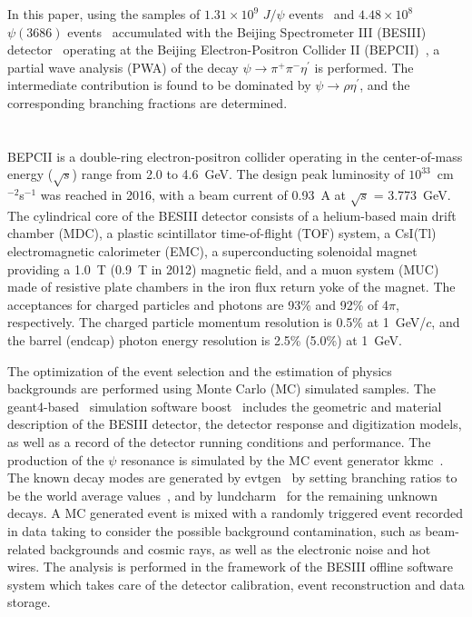 \documentclass[twocolumn,showpacs,aps,prd]{revtex4-1}
\newcommand{\psip}{\psi(3686)}
\begin{document}
In this paper, using the samples of $1.31\times 10^9$ $J/\psi$ events~\cite{jpsinumber} and $4.48\times 10^8$ $\psip$ events~\cite{psipnumber09,psipnumber12} accumulated with the Beijing Spectrometer
III (BESIII) detector~\cite{bes} operating at the Beijing Electron-Positron Collider II (BEPCII)~\cite{bepc}, a partial
wave analysis (PWA) of the decay $\psi \to \pi^+\pi^-\eta^\prime$ is performed. The intermediate contribution is found to be dominated by $\psi \to \rho\eta^\prime$, and the corresponding branching fractions are determined.



\section{}

BEPCII is a double-ring electron-positron collider operating in the center-of-mass energy ($\sqrt s$) range from 2.0 to 4.6~GeV.
The design peak luminosity of $10^{33}$~cm$^{-2}$s$^{-1}$ was reached in 2016, with a beam current of 0.93~A at $\sqrt s$ = 3.773~GeV.
The cylindrical core of the BESIII detector consists of a helium-based main drift chamber (MDC), a plastic scintillator time-of-flight
(TOF) system, a CsI(Tl) electromagnetic calorimeter (EMC), a superconducting solenoidal magnet providing
a 1.0~T (0.9~T in 2012) magnetic field, and a muon system (MUC) made of resistive plate chambers in the iron flux return yoke of the magnet.
The acceptances for charged particles and photons are 93\% and 92\% of 4$\pi$, respectively. The charged particle momentum resolution is 0.5\% at 1~GeV/$c$, and the barrel (endcap) photon energy resolution is 2.5\% (5.0\%) at 1~GeV.


The optimization of the event selection and the estimation of physics backgrounds are performed using Monte Carlo (MC) simulated samples. The {\sc geant4}-based~\cite{genant4} simulation software {\sc boost}~\cite{boost} includes the geometric and material description of
the BESIII detector, the detector response and digitization models, as well as a record of the detector running conditions
and performance. The production of the $\psi$ resonance is simulated by the MC event generator {\sc kkmc}~\cite{kkmc}.
The known decay modes are generated by {\sc evtgen}~\cite{evtgen1,evtgen2} by setting branching ratios to be the world average values~\cite{pdg12},
and by {\sc lundcharm}~\cite{lundcharm} for the remaining unknown decays. A MC generated event is mixed with a randomly triggered event recorded in data taking to consider the possible background contamination, such as beam-related backgrounds and cosmic rays, as well as the electronic noise and hot wires. The analysis is performed in the framework of the BESIII
offline software system which takes care of the detector calibration, event reconstruction and data storage.
\end{document}
